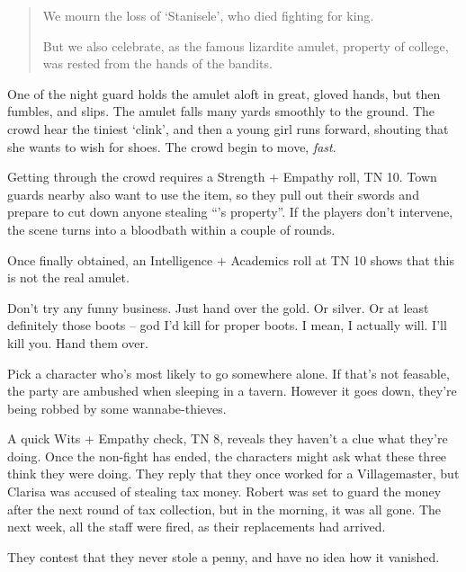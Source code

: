 \begin{multicols}{2}
\begin{boxtext}
\begin{quotation}
		We mourn the loss of `Stanisele', who died fighting for \gls{king}.

		But we also celebrate, as the famous lizardite amulet, property of \gls{college}, was rested from the hands of the bandits.

	\end{quotation}

	One of the night guard holds the amulet aloft in great, gloved hands, but then fumbles, and slips.  The amulet falls many yards smoothly to the ground.  The crowd hear the tiniest `clink', and then a young girl runs forward, shouting that she wants to wish for shoes.  The crowd begin to move, \emph{fast}.

\end{boxtext}

Getting through the crowd requires a Strength + Empathy roll, TN 10.
Town guards nearby also want to use the item, so they pull out their swords and prepare to cut down anyone stealing ``'s property''.
If the players don't intervene, the scene turns into a bloodbath within a couple of rounds.

Once finally obtained, an Intelligence + Academics roll at TN 10 shows that this is not the real amulet.


\begin{speechtext}

	Don't try any funny business.  Just hand over the gold. Or silver.  Or at least definitely those boots -- god I'd kill for proper boots.  I mean, I actually will.  I'll kill you.  Hand them over.

\end{speechtext}

Pick a character who's most likely to go somewhere alone.  If that's not feasable, the party are ambushed when sleeping in a tavern.  However it goes down, they're being robbed by some wannabe-thieves.

A quick Wits + Empathy check, TN 8, reveals they haven't a clue what they're doing.  Once the non-fight has ended, the characters might ask what these three think they were doing.  They reply that they once worked for a Villagemaster, but Clarisa was accused of stealing tax money.  Robert was set to guard the money after the next round of tax collection, but in the morning, it was all gone.  The next week, all the staff were fired, as their replacements had arrived.

They contest that they never stole a penny, and have no idea how it vanished.


\end{multicols}
